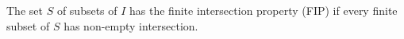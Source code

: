 The set $S$ of subsets of $I$ has the finite intersection property (FIP) if every finite subset of $S$ has non-empty intersection.
